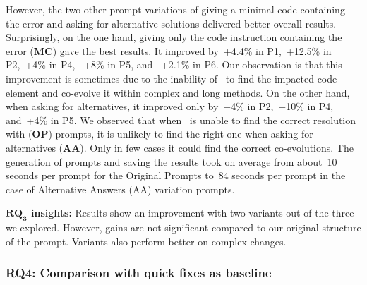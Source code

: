 However, the two other prompt variations of giving a minimal code containing the error and asking for alternative solutions delivered better overall results. 
Surprisingly, on the one hand, giving only the code instruction containing the error (\textbf{MC}) gave the best results. It improved by~+4.4\% in P1,~+12.5\% in P2,~+4\% in P4, ~+8\% in P5, and ~+2.1\% in P6. 
Our observation is that this improvement is sometimes due to the inability of \LLM~to find the impacted code element and co-evolve it within complex and long methods. 
On the other hand, when asking for alternatives, it improved only by~+4\% in P2,~+10\% in P4, and~+4\% in P5. We observed that when \LLM~is unable to find the correct resolution with (\textbf{OP}) prompts, it is unlikely to find the right one when asking for alternatives (\textbf{AA}). Only in few cases it could find the correct co-evolutions.  %
The generation of prompts and saving the results took on average from about~10 seconds per prompt for the Original Prompts to~84 seconds per prompt in the case of Alternative Answers (AA) variation prompts.



\begin{tcolorbox}[boxsep=-2pt]
	\textbf{$\boldsymbol{RQ_3}$ insights:}
	Results show an improvement with two variants out of the three we explored. However, gains are not significant compared to our original structure of the prompt. 
	Variants also perform better on complex changes. 
\end{tcolorbox}

\subsubsection{RQ4: Comparison with quick fixes as baseline}


